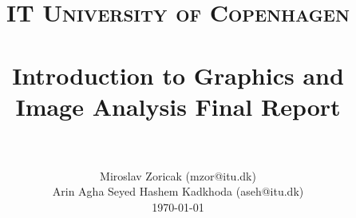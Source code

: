 \documentclass[paper=a4, fontsize=11pt]{scrartcl}
\title{
	\usefont{OT1}{bch}{b}{n}
	\normalfont \normalsize \textsc{IT University of Copenhagen} \\ [25pt]
	\horrule{0.5pt} \\[0.4cm]
	\huge Introduction to Graphics and Image Analysis Final Report \\
	\horrule{2pt} \\[0.5cm]
}
\author{
	\normalfont 
	\normalsize
	Miroslav Zoricak (mzor@itu.dk) \\[-3pt]
	\normalsize
	Arin Agha Seyed Hashem Kadkhoda (aseh@itu.dk) \\[-3pt]
	\normalsize
	\today
}
\date{}
\numberwithin{equation}{section} %
\numberwithin{figure}{section} %
\numberwithin{table}{section} %
\begin{document}
\maketitle
\newpage
\tableofcontents
\newpage









\nocite{*}

\end{document}
